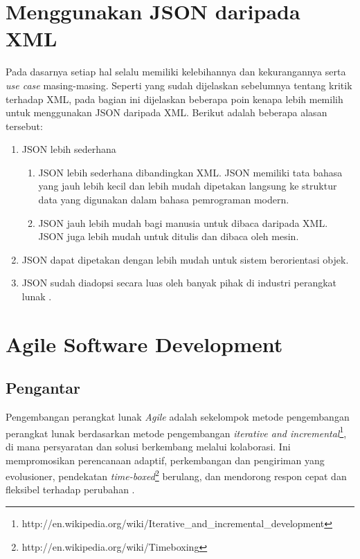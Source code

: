 \documentclass[a4paper, 12pt, oneside]{report}
\begin{document}
\section{Menggunakan JSON daripada XML}

\onehalfspacing Pada dasarnya setiap hal selalu memiliki kelebihannya dan kekurangannya serta \textit{use case} masing-masing. Seperti yang sudah dijelaskan sebelumnya tentang kritik terhadap XML, pada bagian ini dijelaskan beberapa poin kenapa lebih memilih untuk menggunakan JSON daripada XML. Berikut adalah beberapa alasan tersebut:

\begin{enumerate}
  \item JSON lebih sederhana
  \begin{enumerate}
    \item JSON lebih sederhana dibandingkan XML. JSON memiliki tata bahasa yang jauh lebih kecil dan lebih mudah dipetakan langsung ke struktur data yang digunakan dalam bahasa pemrograman modern.
    \item JSON jauh lebih mudah bagi manusia untuk dibaca daripada XML. JSON juga lebih mudah untuk ditulis dan dibaca oleh mesin.
  \end{enumerate}
  \item JSON dapat dipetakan dengan lebih mudah untuk sistem berorientasi objek.
  \item JSON sudah diadopsi secara luas oleh banyak pihak di industri perangkat lunak \cite{json-continue-to-winning}\cite{json-continue-to-push}.
\end{enumerate}

\section{Agile Software Development}
\subsection{Pengantar}
\onehalfspacing Pengembangan perangkat lunak \textit{Agile} adalah sekelompok metode pengembangan perangkat lunak berdasarkan metode pengembangan \textit{iterative and incremental}\footnote{http://en.wikipedia.org/wiki/Iterative\_and\_incremental\_development}, di mana persyaratan dan solusi berkembang melalui kolaborasi. Ini mempromosikan perencanaan adaptif, perkembangan dan pengiriman yang evolusioner, pendekatan \textit{time-boxed}\footnote{http://en.wikipedia.org/wiki/Timeboxing} berulang, dan mendorong respon cepat dan fleksibel terhadap perubahan \cite{agile-wikipedia}.
\end{document}
